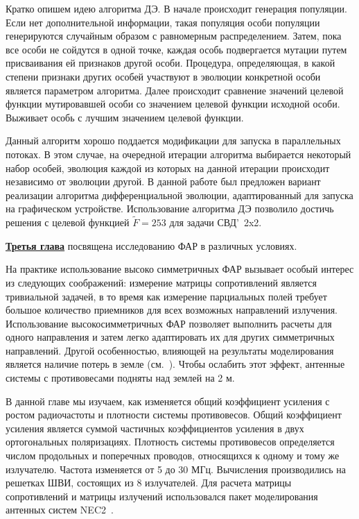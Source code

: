 Кратко опишем идею алгоритма ДЭ. В начале происходит генерация популяции. Если нет дополнительной информации, такая популяция особи популяции генерируются случайным образом с равномерным распределением. Затем, пока все особи не сойдутся в одной точке, каждая особь подвергается мутации путем присваивания ей признаков другой особи. Процедура, определяющая, в какой степени признаки других особей участвуют в эволюции конкретной особи является параметром алгоритма. Далее происходит сравнение значений целевой функции мутировавшей особи со значением целевой функции исходной особи. Выживает особь с лучшим значением целевой функции.

Данный алгоритм хорошо поддается модификации для запуска в параллельных потоках. В этом случае, на очередной итерации алгоритма выбирается некоторый набор особей, эволюция каждой из которых на данной итерации происходит независимо от эволюции другой. В данной работе был предложен вариант реализации алгоритма дифференциальной эволюции, адаптированный для запуска на графическом устройстве. Использование алгоритма ДЭ позволило достичь решения с целевой функцией $\tilde{F} = 253$ для задачи СВД'~2x2.

\underline{\textbf{Третья глава}} посвящена исследованию ФАР в различных условиях.

На практике использование высоко симметричных ФАР вызывает особый интерес из следующих соображений: измерение матрицы сопротивлений является тривиальной задачей, в то время как измерение парциальных полей требует большое количество приемников для всех возможных направлений излучения. Использование высокосимметричных ФАР позволяет выполнить расчеты для одного направления и затем легко адаптировать их для других симметричных направлений. Другой особенностью, влияющей на результаты моделирования является наличие потерь в земле (см.~\cite{yurkov:groundloss}). Чтобы ослабить этот эффект, антенные системы с противовесами подняты над землей на 2 м.

В данной главе мы изучаем, как изменяется общий коэффициент усиления с ростом радиочастоты и плотности системы противовесов. Общий коэффициент усиления является суммой частичных коэффициентов усиления в  двух ортогональных поляризациях. Плотность системы противовесов определяется числом продольных и поперечных проводов, относящихся к одному и тому же излучателю. Частота изменяется от 5 до 30 МГц. Вычисления производились на решетках ШВИ, состоящих из 8 излучателей. Для расчета матрицы сопротивлений и матрицы излучений использовался пакет моделирования антенных систем NEC2~\cite{bruke:nec2}.

